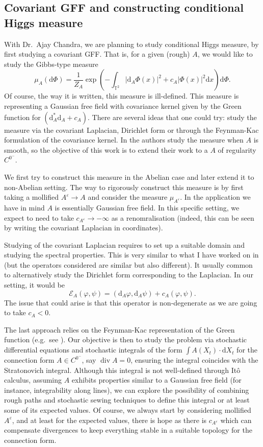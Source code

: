 \documentclass[11pt]{article}
\numberwithin{equation}{section}
\theoremstyle{definition}
\theoremstyle{remark}
\newcommand{\diff}{\mathrm{d}}
\newcommand{\1}{\mathbf 1}
\newcommand{\<}{\langle}
\renewcommand{\>}{\rangle}
\newcommand{\bT}{\mathbb T}
\begin{document}
\subsection{Covariant GFF and constructing conditional Higgs measure}
With Dr.\ Ajay Chandra, we are planning to study conditional Higgs measure, by first studying a covariant GFF. That is, for a given (rough) $A$, we would like to study the Gibbs-type measure
\[
\mu_A(\diff\Phi)=\frac 1 {Z_A} \exp\left( -\int_{\bT^2}|\diff_A\Phi(x)|^2+c_A|\Phi(x)|^2\diff x\right)\diff\Phi. 
\]
Of course, the way it is written, this measure is ill-defined. This measure is representing a Gaussian free field with covariance kernel given by the Green function for $(\diff_A^*\diff_A+c_A)$. There are several ideas that one could try: study the measure via the covariant Laplacian, Dirichlet form or through the Feynman-Kac formulation of the covariance kernel. In \cite{SP24} the authors study the measure when $A$ is smooth, so the objective of this work is to extend their work to a $A$ of regularity $C^{0^-}$. 

We first try to construct this measure in the Abelian case and later extend it to non-Abelian setting. The way to rigorously construct this measure is by first taking a mollified $A^\varepsilon\to A$ and consider the measure $\mu_{A^\varepsilon}$. In the application we have in mind $A$ is essentially Gaussian free field. In this specific setting, we expect to need to take $c_{A^\varepsilon}\to-\infty$ as a renomralisation (indeed, this can be seen by writing the covariant Laplacian in coordinates). 

Studying of the covariant Laplacian requires to set up a suitable domain and studying the spectral properties. This is very similar to what I have worked on in  (but the operators considered are similar but also different). It usually common to alternatively study the Dirichlet form corresponding to the Laplacian. In our setting, it would be 
\[
\mathcal E_A(\varphi,\psi)=(\diff_A\varphi,\diff_A\psi)+c_A(\varphi,\psi).
\]
The issue that could arise is that this operator is non-degenerate as we are going to take $c_A< 0$. 

The last approach relies on the Feynman-Kac representation of the Green function (e.g.\ see \cite{SP24}). Our objective is then to study the problem via stochastic differential equations and stochastic integrals of the form $\int A(X_t)\cdot\diff X_t$ for the connection form $A\in C^{0^-}$, say $\operatorname{div} A=0$,  ensuring the integral coincides with the Stratonovich integral. Although this integral is not well-defined through Itô calculus, assuming $A$ exhibits properties similar to a Gaussian free field (for instance, integrability along lines), we can explore the possibility of combining rough paths and stochastic sewing techniques to define this integral or at least some of its expected values. Of course, we always start by considering mollified $A^\varepsilon$, and at least for the expected values, there is hope as there is $c_{A^\varepsilon}$ which can compensate divergences to keep everything stable in a suitable topology for the connection form. 
\end{document}

